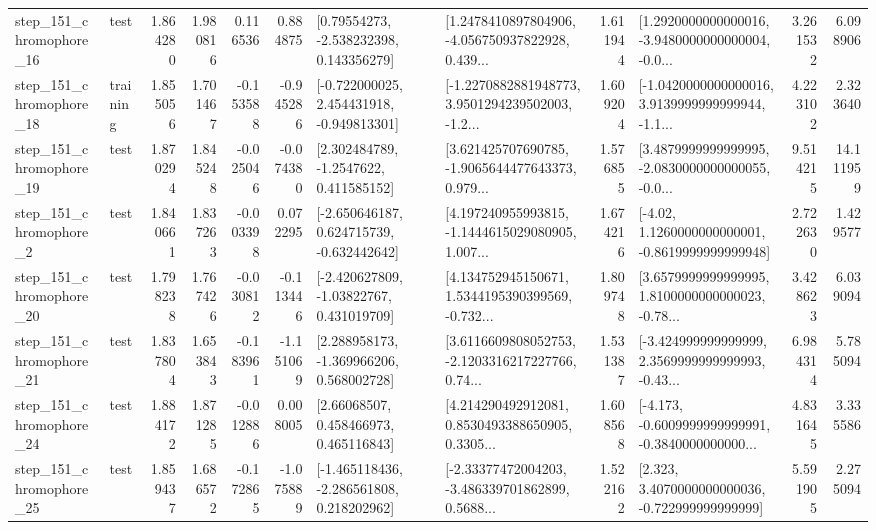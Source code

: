 \begin{tabular}{llrrrrllrlrr}
  step\_151\_chromophore\_16 &      test &      1.864280 &    1.980816 &      0.116536 &  0.884875 &     [0.79554273, -2.538232398, 0.143356279] &  [1.2478410897804906, -4.056750937822928, 0.439... &       1.611944 &  [1.2920000000000016, -3.9480000000000004, -0.0... &            3.261532 &          6.098906 \\
  step\_151\_chromophore\_18 &  training &      1.855056 &    1.701467 &     -0.153588 & -0.945286 &   [-0.722000025, 2.454431918, -0.949813301] &  [-1.2270882881948773, 3.9501294239502003, -1.2... &       1.609204 &  [-1.0420000000000016, 3.9139999999999944, -1.1... &            4.223102 &          2.323640 \\
  step\_151\_chromophore\_19 &      test &      1.870294 &    1.845248 &     -0.025046 & -0.074380 &      [2.302484789, -1.2547622, 0.411585152] &  [3.621425707690785, -1.9065644477643373, 0.979... &       1.576855 &  [3.4879999999999995, -2.0830000000000055, -0.0... &            9.514215 &         14.111959 \\
   step\_151\_chromophore\_2 &      test &      1.840661 &    1.837263 &     -0.003398 &  0.072295 &   [-2.650646187, 0.624715739, -0.632442642] &  [4.197240955993815, -1.1444615029080905, 1.007... &       1.674216 &   [-4.02, 1.1260000000000001, -0.8619999999999948] &            2.722630 &          1.429577 \\
  step\_151\_chromophore\_20 &      test &      1.798238 &    1.767426 &     -0.030812 & -0.113446 &    [-2.420627809, -1.03822767, 0.431019709] &  [4.134752945150671, 1.5344195390399569, -0.732... &       1.809748 &  [3.6579999999999995, 1.8100000000000023, -0.78... &            3.428623 &          6.039094 \\
  step\_151\_chromophore\_21 &      test &      1.837804 &    1.653843 &     -0.183961 & -1.151069 &    [2.288958173, -1.369966206, 0.568002728] &  [3.6116609808052753, -2.1203316217227766, 0.74... &       1.531387 &  [-3.424999999999999, 2.3569999999999993, -0.43... &            6.984314 &          5.785094 \\
  step\_151\_chromophore\_24 &      test &      1.884172 &    1.871285 &     -0.012886 &  0.008005 &      [2.66068507, 0.458466973, 0.465116843] &  [4.214290492912081, 0.8530493388650905, 0.3305... &       1.608568 &  [-4.173, -0.6009999999999991, -0.3840000000000... &            4.831645 &          3.335586 \\
  step\_151\_chromophore\_25 &      test &      1.859437 &    1.686572 &     -0.172865 & -1.075889 &   [-1.465118436, -2.286561808, 0.218202962] &  [-2.33377472004203, -3.486339701862899, 0.5688... &       1.522162 &    [2.323, 3.4070000000000036, -0.722999999999999] &            5.591905 &          2.275094 \\

\end{tabular}
